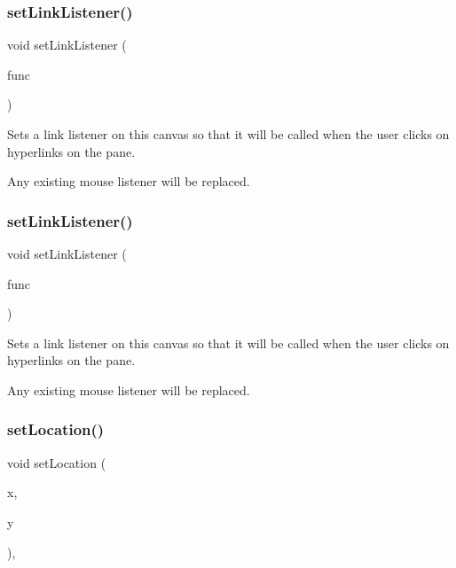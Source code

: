 \subsubsection{\texorpdfstring{set\+Link\+Listener()}{setLinkListener()}\hspace{0.1cm}{\footnotesize\ttfamily [1/2]}}
{\footnotesize\ttfamily void set\+Link\+Listener (\begin{DoxyParamCaption}\item[{G\+Event\+Listener}]{func }\end{DoxyParamCaption})\hspace{0.3cm}{\ttfamily [virtual]}}



Sets a link listener on this canvas so that it will be called when the user clicks on hyperlinks on the pane. 

Any existing mouse listener will be replaced. \mbox{\label{classGBrowserPane_aca745635b2c4ceb74587ca5cfc26f0c3}} 
\subsubsection{\texorpdfstring{set\+Link\+Listener()}{setLinkListener()}\hspace{0.1cm}{\footnotesize\ttfamily [2/2]}}
{\footnotesize\ttfamily void set\+Link\+Listener (\begin{DoxyParamCaption}\item[{G\+Event\+Listener\+Void}]{func }\end{DoxyParamCaption})\hspace{0.3cm}{\ttfamily [virtual]}}



Sets a link listener on this canvas so that it will be called when the user clicks on hyperlinks on the pane. 

Any existing mouse listener will be replaced. \mbox{\label{classGInteractor_a04594e8ba9b98513a64f1da00dcae18c}} 
\subsubsection{\texorpdfstring{set\+Location()}{setLocation()}}
{\footnotesize\ttfamily void set\+Location (\begin{DoxyParamCaption}\item[{double}]{x,  }\item[{double}]{y }\end{DoxyParamCaption})\hspace{0.3cm}{\ttfamily [virtual]}, {\ttfamily [inherited]}}



